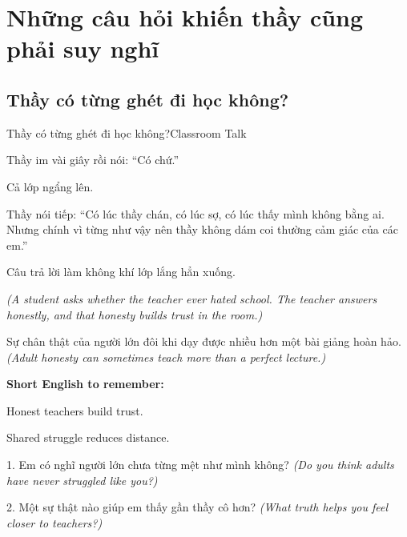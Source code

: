 \chapter{Những câu hỏi khiến thầy cũng phải suy nghĩ}

\section{Thầy có từng ghét đi học không?}
\begin{truyen}{Thầy có từng ghét đi học không?}{Classroom Talk}

Thầy im vài giây rồi nói: ``Có chứ.''

Cả lớp ngẩng lên.

Thầy nói tiếp: ``Có lúc thầy chán, có lúc sợ, có lúc thấy mình không bằng ai. Nhưng chính vì từng như vậy nên thầy không dám coi thường cảm giác của các em.''

Câu trả lời làm không khí lớp lắng hẳn xuống.

\textit{(A student asks whether the teacher ever hated school. The teacher answers honestly, and that honesty builds trust in the room.)}
\end{truyen}

\begin{baihoc}
Sự chân thật của người lớn đôi khi dạy được nhiều hơn một bài giảng hoàn hảo.
\textit{(Adult honesty can sometimes teach more than a perfect lecture.)}
\end{baihoc}

\begin{ghinhoanh}
\textbf{Short English to remember:}

Honest teachers build trust.

Shared struggle reduces distance.
\end{ghinhoanh}

\begin{tuhocnhanh}
1. Em có nghĩ người lớn chưa từng mệt như mình không? \textit{(Do you think adults have never struggled like you?)}

2. Một sự thật nào giúp em thấy gần thầy cô hơn? \textit{(What truth helps you feel closer to teachers?)}
\end{tuhocnhanh}
\ngancach

